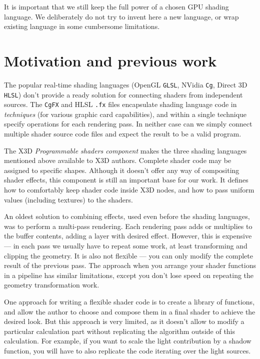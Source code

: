 \documentclass{egpubl}
\begin{document}
It is important that we still keep
the full power of a chosen GPU shading language.
We deliberately do not try to invent here a new language, or wrap existing
language in some cumbersome limitations.

\section{Motivation and previous work}

The popular real-time shading languages (OpenGL \texttt{GLSL}, NVidia \texttt{Cg}, Direct 3D \texttt{HLSL})
don't provide a ready solution for connecting shaders from independent sources.
The \texttt{CgFX} and HLSL \texttt{.fx} files encapsulate shading language code
in \emph{techniques} (for various graphic card capabilities),
and within a single technique specify operations for each rendering pass.
In neither case can we simply connect multiple shader source code files
and expect the result to be a valid program.

The X3D \textit{Programmable shaders component} \cite{x3d:shaders}
makes the three shading languages mentioned above available to X3D authors.
Complete shader code may be assigned to specific shapes.
Although it doesn't offer any way of compositing shader effects,
this component is still an important base for our work. It defines
how to comfortably keep shader code inside X3D nodes, and how to pass uniform
values (including textures) to the shaders.

An oldest solution to combining effects, used even before the shading languages,
was to perform a multi-pass rendering. Each rendering pass adds or multiplies
to the buffer contents, adding a layer with desired effect.
However, this is expensive --- in each pass we usually have to repeat
some work, at least transforming and clipping the geometry.
It is also not flexible --- you can only modify
the complete result of the previous pass.
The approach when you arrange your shader functions in a pipeline
has similar limitations, except you
don't lose speed on repeating the geometry transformation work.

One approach for writing a flexible shader code is to create
a library of functions, and allow the author to choose and compose them
in a final shader to achieve the desired look. But this approach is very limited,
as it doesn't allow to modify a particular calculation part without
replicating the algorithm outside of this calculation.
For example, if you want to scale the light contribution by a shadow function,
you will have to also replicate the code iterating over the light sources.
\end{document}
